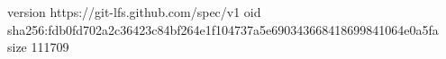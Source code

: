 version https://git-lfs.github.com/spec/v1
oid sha256:fdb0fd702a2c36423c84bf264e1f104737a5e690343668418699841064e0a5fa
size 111709
